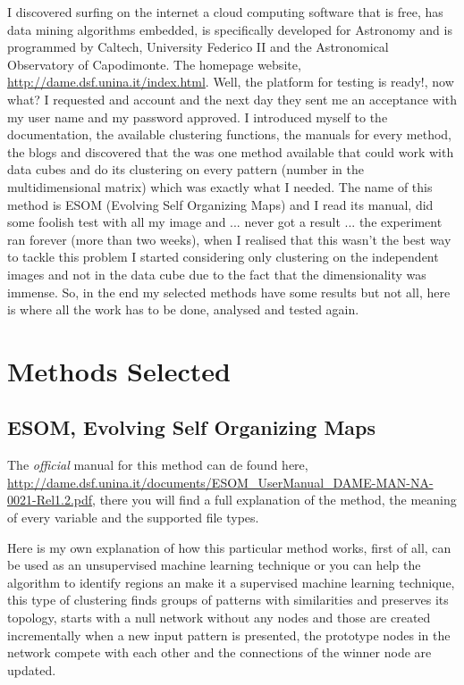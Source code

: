 \documentclass[11pt,fleqn]{book} %
\begin{document}
I discovered surfing on the internet a cloud computing software that is free, has data mining algorithms embedded, is specifically developed for Astronomy and is programmed by Caltech, University Federico II and the Astronomical Observatory of Capodimonte. The homepage website, \url{http://dame.dsf.unina.it/index.html}. Well, the platform for testing is ready!, now what? I requested and account and the next day they sent me an acceptance with my user name and my password approved.
I introduced myself to the documentation, the available clustering functions, the manuals for every method, the blogs and discovered that the was one method available that could work with data cubes and do its clustering on every pattern (number in the multidimensional matrix) which was exactly what I needed. The name of this method is ESOM (Evolving Self Organizing Maps) and I read its manual, did some foolish test with all my image and ... never got a result ... the experiment ran forever (more than two weeks), when I realised that this wasn't the best way to tackle this problem I started considering only clustering on the independent images and not in the data cube due to the fact that the dimensionality was immense. So, in the end my selected methods have some results but not all, here is where all the work has to be done, analysed and tested again.

\section{Methods Selected}

\subsection{ESOM, Evolving Self Organizing Maps}
The \emph{official} manual for this method can de found here, \url{http://dame.dsf.unina.it/documents/ESOM_UserManual_DAME-MAN-NA-0021-Rel1.2.pdf}, there you will find a full explanation of the method, the meaning of every variable and the supported file types.

Here is my own explanation of how this particular method works, first of all, can be used as an unsupervised machine learning technique or you can help the algorithm to identify regions an make it a supervised machine learning technique, this type of clustering finds groups of patterns with similarities and preserves its topology, starts with a null network without any nodes and those are created incrementally when a new input pattern is presented, the prototype nodes in the network compete with each other and the connections of the winner node are updated. 
\end{document}
